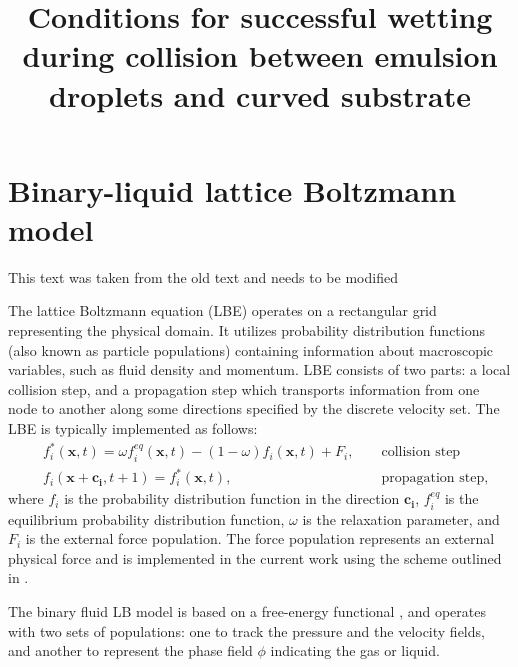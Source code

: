\documentclass{article}
\title{Conditions for successful wetting during collision between emulsion droplets and curved substrate}
\begin{document}
\maketitle


\section{Binary-liquid lattice Boltzmann model}
{\color{red} This text was taken from the old text and needs to be modified}

The lattice Boltzmann equation (LBE) operates on a rectangular grid representing the
physical domain. It utilizes
probability distribution functions (also known as particle populations)
containing information about
macroscopic variables, such as fluid density and momentum. LBE consists of
two parts: a local collision step, and a propagation step which transports
information from one node to another along some 
directions specified by the discrete velocity set.
The LBE is typically implemented as follows:
\begin{equation}
\label{standard:implementation}
\begin{aligned}
&f_i^{*}(\bm{x},t)=\omega f_i^{eq}(\bm{x},t)-(1-\omega) f_i(\bm{x},t) +
F_i,&&\text{ collision step}\\
&f_i(\bm{x}+\bm{c_i},t+1)=f_i^{*}(\bm{x},t),&&\text{ propagation step}, 
\end{aligned}
\end{equation}
where $f_i$ is the probability distribution function in the direction $\bm{c_i}$,
 $f_i^{eq}$ is the equilibrium probability distribution function, $\omega$ is the
relaxation parameter, and $F_i$ is the external force population. The force population
represents an external physical force and is implemented in the current work using the scheme
outlined in \citet{guo}.

The binary fluid LB model is
based on a free-energy functional \cite{swift,landau}, and operates with two
sets of populations: one to track the pressure and the velocity fields, and another to represent the
phase field $\phi$ indicating the gas or liquid.
\end{document}
